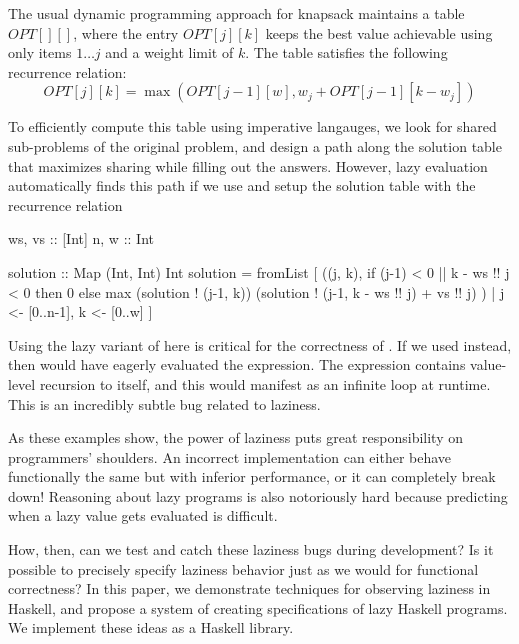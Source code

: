 \documentclass[acmsmall,review]{acmart}\settopmatter{}
\begin{document}
The usual dynamic programming approach for knapsack maintains a
table $OPT[][]$, where the entry $OPT[j][k]$ keeps the best value
achievable using only items $1\dots j$ and a weight limit of $k$. The
table satisfies the following recurrence relation: $$OPT[j][k]
= \max(OPT[j-1][w], w_j + OPT[j-1][k-w_j])$$

To efficiently compute this table using imperative langauges, we look
for shared sub-problems of the original problem, and design a path
along the solution table that maximizes sharing while filling out the
answers.
%
However, lazy evaluation automatically finds this path if we
use  and setup the solution table with the
recurrence relation 
\begin{inlinecode}
ws, vs :: [Int]
n,  w  :: Int

solution :: Map (Int, Int) Int
solution = fromList [ ((j, k),
                       if (j-1) < 0 || k - ws !! j < 0
                       then 0
                       else max (solution ! (j-1, k))
                                (solution ! (j-1, k - ws !! j) + vs !! j)
                      )
                    | j <- [0..n-1], k <- [0..w] ]
\end{inlinecode}

Using the lazy variant of  here is critical for the correctness
of . If we used  instead, then 
would have eagerly evaluated the  expression. The  expression
contains value-level recursion to itself, and this would manifest as an infinite
loop at runtime. This is an incredibly subtle bug related to laziness.

As these examples show, the power of laziness puts great
responsibility on programmers' shoulders. An incorrect implementation
can either behave functionally the same but with inferior performance,
or it can completely break down! Reasoning about lazy programs is also
notoriously hard because predicting when a lazy value gets evaluated
is difficult.


How, then, can we test and catch these laziness bugs during development? Is it
possible to precisely specify laziness behavior just as we would for functional
correctness?
%
In this paper, we demonstrate techniques for observing laziness in Haskell, and
propose a system of creating specifications of lazy Haskell programs. We
implement these ideas as a Haskell library.
\end{document}
